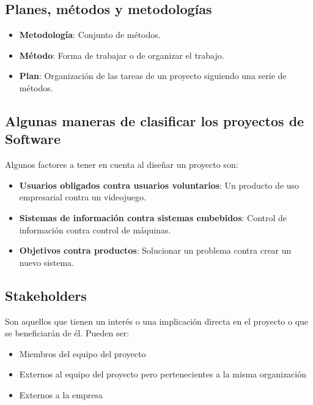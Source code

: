 \documentclass[12pt]{article}
\begin{document}
\subsection{Planes, métodos y metodologías}
\label{1.7.0}

\begin{itemize}
    \item {\textbf{Metodología}: Conjunto de métodos.}
    \item {\textbf{Método}: Forma de trabajar o de organizar el trabajo.}
    \item {\textbf{Plan}: Organización de las tareas de un proyecto siguiendo una serie de métodos.}
\end{itemize}

\subsection{Algunas maneras de clasificar los proyectos de Software}
\label{1.8.0}

{Algunos factores a tener en cuenta al diseñar un proyecto son:}

\begin{itemize}
    \item {\textbf{Usuarios obligados contra usuarios voluntarios}: Un producto de uso empresarial contra un videojuego.}
    \item {\textbf{Sistemas de información contra sistemas embebidos}: Control de información contra control de máquinas.}
    \item {\textbf{Objetivos contra productos}: Solucionar un problema contra crear un nuevo sistema.}
\end{itemize}

\subsection{Stakeholders}
\label{1.9.0}

{Son aquellos que tienen un interés o una implicación directa en el proyecto o que se beneficiarán de él. Pueden ser:}

\begin{itemize}
    \item {Miembros del equipo del proyecto}
    \item {Externos al equipo del proyecto pero pertenecientes a la misma organización}
    \item {Externos a la empresa}
\end{itemize}
\end{document}
